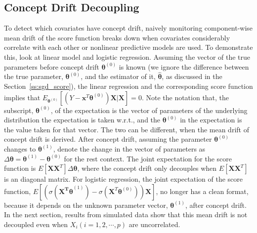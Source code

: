 \documentclass[twoside,11pt]{article}
\begin{document}
\subsection{Concept Drift Decoupling}
To detect which covariates have concept drift, naively monitoring component-wise mean {drift} of the score function breaks down when {covariates considerably correlate with each other} or nonlinear predictive models are used. To demonstrate this, look at linear model and logistic regression. Assuming the vector of the true parameters {before concept drift $\bm { \theta}^ { (0)}$} is known (we ignore the difference between the true parameter, $\bm { \theta}^ { (0)}$, and the estimator of it, $\hat{\bm { \theta}}$, as discussed in the Section~\ref{ss:sgd_score}), the linear regression and the corresponding score function implies that {$E_{\bm{ \theta}^{ (0)}}[(Y - \bm {x}^T\bm { \theta}^{ (0)} ) \bm {X}|\bm {X}]=0$}. Note the notation that, the subscript, ${ \bm{\theta}}^{ (0)}$, of the expectation is the vector of parameters of the underlying distribution the expectation is taken w.r.t., and the $\bm{ \theta}^{ (0)}$ in the expectation is the value taken for that vector. The two can be different, when the mean drift of concept drift is derived. After concept drift, {assuming the parameter $\bm { \theta}^{ (0)}$ changes to $\bm { \theta} ^{ (1)}$, denote the change in the vector of parameters as $ \Delta \bm { \theta} = \bm { \theta} ^{ (1)} - \bm { \theta}^ { (0)}$ for the rest context.} {The} joint expectation for the score function is $E [\bm {X}\bm {X}^T] \Delta \bm { \theta}$, where the concept drift only decouples when $E [\bm {X}\bm {X}^T]$ is an {diagonal} matrix. For logistic regression, the joint expectation of the score function, $E[(\sigma ( \bm {  \bm {X}^T \theta}^{ (1)}) - \sigma ( \bm {X}^T\bm { \theta}^{ (0)} )) \bm {X}]$,  no longer has a clean format, because it depends on the unknown parameter vector, $\bm { \theta} ^{ (1)}$, after concept drift. In the next section, results from simulated data show that this mean {drift} is not decoupled even when $X _{i} (i = 1,2, \cdots, p)$ are uncorrelated. 
\end{document}

